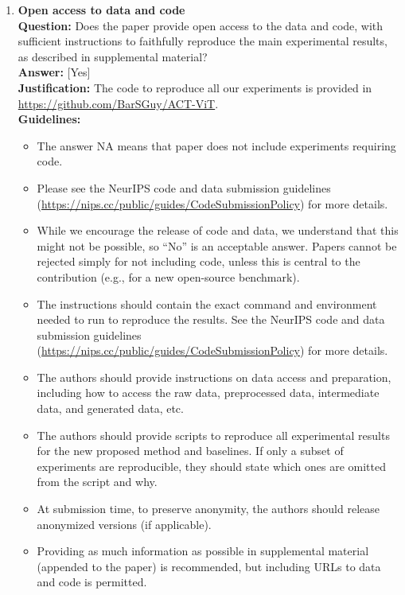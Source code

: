 \begin{enumerate}
\item \textbf{Open access to data and code}\\
\textbf{Question:} Does the paper provide open access to the data and code, with sufficient instructions to faithfully reproduce the main experimental results, as described in supplemental material?\\
\textbf{Answer:} [Yes]\\
\textbf{Justification:} The code to reproduce all our experiments is provided in \url{https://github.com/BarSGuy/ACT-ViT}.\\
\textbf{Guidelines:}
\begin{itemize}
\item The answer NA means that paper does not include experiments requiring code.
\item Please see the NeurIPS code and data submission guidelines (\url{https://nips.cc/public/guides/CodeSubmissionPolicy}) for more details.
\item While we encourage the release of code and data, we understand that this might not be possible, so ``No'' is an acceptable answer. Papers cannot be rejected simply for not including code, unless this is central to the contribution (e.g., for a new open-source benchmark).
\item The instructions should contain the exact command and environment needed to run to reproduce the results. See the NeurIPS code and data submission guidelines (\url{https://nips.cc/public/guides/CodeSubmissionPolicy}) for more details.
\item The authors should provide instructions on data access and preparation, including how to access the raw data, preprocessed data, intermediate data, and generated data, etc.
\item The authors should provide scripts to reproduce all experimental results for the new proposed method and baselines. If only a subset of experiments are reproducible, they should state which ones are omitted from the script and why.
\item At submission time, to preserve anonymity, the authors should release anonymized versions (if applicable).
\item Providing as much information as possible in supplemental material (appended to the paper) is recommended, but including URLs to data and code is permitted.
\end{itemize}


\end{enumerate}
